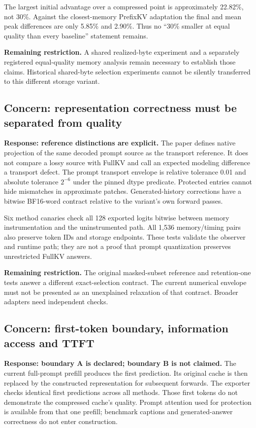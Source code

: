 \documentclass[11pt]{article}
\begin{document}
The largest initial advantage over a compressed point is approximately
22.82\%, not 30\%. Against the closest-memory PrefixKV adaptation the
final and mean peak differences are only 5.85\% and 2.90\%. Thus no
``30\% smaller at equal quality than every baseline'' statement remains.

\textbf{Remaining restriction.} A shared realized-byte experiment and a
separately registered equal-quality memory analysis remain necessary to
establish those claims. Historical shared-byte selection experiments
cannot be silently transferred to this different storage variant.

\subsection{Concern: representation correctness must be separated from quality}
\textbf{Response: reference distinctions are explicit.}
The paper defines native projection of the same decoded prompt source
as the transport reference. It does not compare a lossy source with
FullKV and call an expected modeling difference a transport defect. The
prompt transport envelope is relative tolerance 0.01 and absolute tolerance
$2^{-6}$ under the pinned dtype predicate. Protected entries cannot hide
mismatches in approximate patches. Generated-history corrections have a
bitwise BF16-word contract relative to the variant's own forward passes.

Six method canaries check all 128 exported logits bitwise between memory
instrumentation and the uninstrumented path. All 1,536 memory/timing
pairs also preserve token IDs and storage endpoints. These tests validate
the observer and runtime path; they are not a proof that prompt quantization
preserves unrestricted FullKV answers.

\textbf{Remaining restriction.} The original masked-subset reference and
retention-one tests answer a different exact-selection contract. The
current numerical envelope must not be presented as an unexplained
relaxation of that contract. Broader adapters need independent checks.

\subsection{Concern: first-token boundary, information access and TTFT}
\textbf{Response: boundary A is declared; boundary B is not claimed.}
The current full-prompt prefill produces the first prediction. Its original
cache is then replaced by the constructed representation for subsequent
forwards. The exporter checks identical first predictions across all
methods. Those first tokens do not demonstrate the compressed cache's
quality. Prompt attention used for protection is available from that one
prefill; benchmark captions and generated-answer correctness do not enter
construction.
\end{document}

